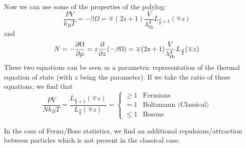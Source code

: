 \documentclass[a4paper,twoside,master.tex]{subfiles}
\begin{document}
Now we can use some of the properties of the polylog:
\begin{equation}
    \frac{PV}{k_B T} = - \beta \Omega = \mp (2s+1) \frac{V}{\lambda_{\text{th}}^d} L_{\frac{d}{2} + 1}(\mp z)
\end{equation}
and
\begin{equation}
    N = - \pdv{\Omega}{\mu} = z \pdv{z}(- \beta \Omega) = \mp (2s+1) \frac{V}{\lambda_{\text{th}}^d} L_{\frac{d}{2}}(\mp z)
\end{equation}
These two equations can be seen as a parametric representation of the thermal equation of state (with $ z $ being the parameter). If we take the ratio of these equations, we find that
\begin{equation}
    \frac{PV}{Nk_B T} = \frac{L_{\frac{d}{2} + 1}(\mp z)}{L_{\frac{d}{2}}(\mp z)} = \begin{cases} \geq 1 & \text{Fermions} \\ = 1 & \text{Boltzmann (Classical)} \\ \leq 1 & \text{Bosons} \end{cases}
\end{equation}

In the case of Fermi/Bose statistics, we find an additional repulsions/attraction between particles which is not present in the classical case.
\end{document}
